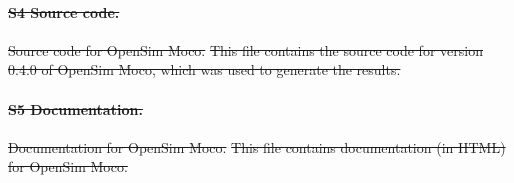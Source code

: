 \documentclass[10pt,letterpaper]{article}
\providecommand{\DIFdeltex}[1]{{\protect\color{red}\sout{#1}}}                      %
\providecommand{\DIFdelend}{} %
\providecommand{\DIFdel}[1]{\texorpdfstring{\DIFdeltex{#1}}{}} %
\DeclareRobustCommand{\DIFdelend}{\DIFOaddend \let\includegraphics\DIFOincludegraphics} %
\begin{document}
\paragraph*{\DIFdel{S4 Source code.}}
\DIFdel{Source code for OpenSim Moco.}%
\DIFdel{This file contains the source code for version 0.4.0 of OpenSim Moco, which was used to generate the results.
}%

\paragraph*{\DIFdel{S5 Documentation.}}
\DIFdel{Documentation for OpenSim Moco.}%
\DIFdel{This file contains documentation (in HTML) for OpenSim Moco.
}%




\DIFdelend 
\end{document}
